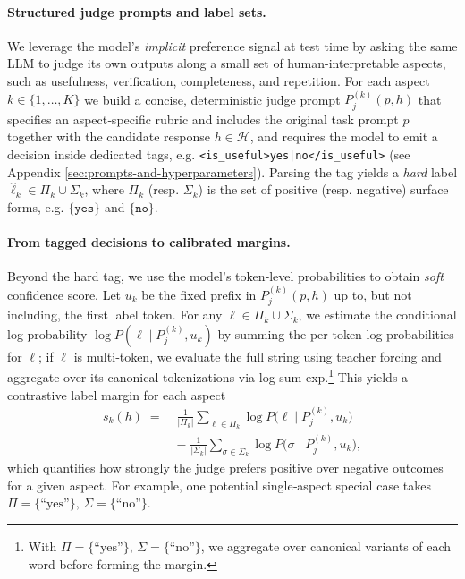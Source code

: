 \documentclass[11pt]{article}
\theoremstyle{plain}
\theoremstyle{definition}
\theoremstyle{remark}
\begin{document}
\paragraph{Structured judge prompts and label sets.} We leverage the model’s \emph{implicit} preference signal at test time by asking the same LLM to judge its own outputs along a small set of human-interpretable aspects, such as usefulness, verification, completeness, and repetition. For each aspect \(k\in\{1,\dots,K\}\) we build a concise, deterministic judge prompt \(P^{(k)}_j(p,h)\) that specifies an aspect‑specific rubric and includes the original task prompt \(p\) together with the candidate response \(h\in\mathcal{H}\), and requires the model to emit a decision inside dedicated tags, e.g. \texttt{<is\_useful>yes|no</is\_useful>} (see Appendix \cref{sec:prompts-and-hyperparameters}). Parsing the tag yields a \emph{hard} label \(\hat\ell_k\in\Pi_k\cup\Sigma_k\), where \(\Pi_k\) (resp. \(\Sigma_k\)) is the set of positive (resp. negative) surface forms, e.g. \(\{\texttt{yes}\}\) and \(\{\texttt{no}\}\).

\paragraph{From tagged decisions to calibrated margins.} Beyond the hard tag, we use the model’s token‑level probabilities to obtain \emph{soft} confidence score. Let \(u_k\) be the fixed prefix in \(P^{(k)}_j(p,h)\) up to, but not including, the first label token. For any \(\ell\in\Pi_k\cup\Sigma_k\), we estimate the conditional log‑probability \(\log P(\ell\mid P^{(k)}_j,u_k)\) by summing the per‑token log‑probabilities for \(\ell\); if \(\ell\) is multi‑token, we evaluate the full string using teacher forcing and aggregate over its canonical tokenizations via log‑sum‑exp.\footnote{With \(\Pi=\{\text{``yes''}\},\,\Sigma=\{\text{``no''}\}\), we aggregate over canonical variants of each word before forming the margin.} This yields a contrastive label margin for each aspect
\[
  \begin{aligned}
    s_k(h)\;=\;&\frac{1}{|\Pi_k|}\sum_{\ell\in\Pi_k}\log P\!\bigl(\ell\mid P^{(k)}_j,u_k\bigr)\\
    &-\;\frac{1}{|\Sigma_k|}\sum_{\sigma\in\Sigma_k}\log P\!\bigl(\sigma\mid P^{(k)}_j,u_k\bigr),
  \end{aligned}
\]
which quantifies how strongly the judge prefers positive over negative outcomes for a given aspect. For example, one potential single‑aspect special case takes \(\Pi=\{\text{``yes''}\},\,\Sigma=\{\text{``no''}\}\).
\end{document}
